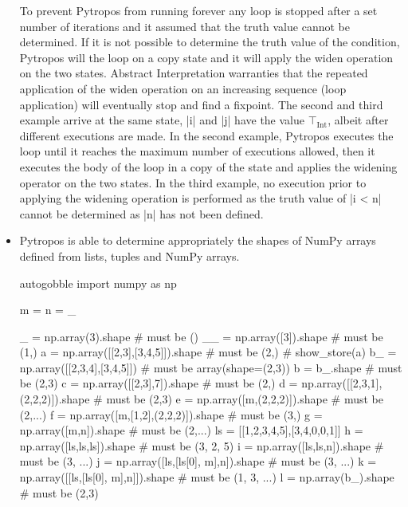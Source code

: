\begin{itemize}
  To prevent Pytropos from running forever any loop is stopped after a set number of
  iterations and it assumed that the truth value cannot be determined.  If it is not
  possible to determine the truth value of the condition, Pytropos will the loop on a copy
  state and it will apply the widen operation on the two states. Abstract Interpretation
  warranties that the repeated application of the widen operation on an increasing
  sequence (loop application) will eventually stop and find a fixpoint. The second and
  third example arrive at the same state, \pycode|i| and \pycode|j| have the value
  $\top_{\text{Int}}$, albeit after different executions are made. In the second example,
  Pytropos executes the loop until it reaches the maximum number of executions allowed,
  then it executes the body of the loop in a copy of the state and applies the widening
  operator on the two states. In the third example, no execution prior to applying the
  widening operation is performed as the truth value of \pycode|i < n| cannot be
  determined as \pycode|n| has not been defined.

\item Pytropos is able to determine appropriately the shapes of NumPy arrays defined from
  lists, tuples and NumPy arrays.

  \begin{pythoncode*}{autogobble}
    import numpy as np

    m = n = _

    _ = np.array(3).shape                   # must be ()
    __ = np.array([3]).shape                # must be (1,)
    a = np.array([[2,3],[3,4,5]]).shape     # must be (2,)
    # show_store(a)
    b_ = np.array([[2,3,4],[3,4,5]])        # must be array(shape=(2,3))
    b = b_.shape                            # must be (2,3)
    c = np.array([[2,3],7]).shape           # must be (2,)
    d = np.array([[2,3,1],(2,2,2)]).shape   # must be (2,3)
    e = np.array([m,(2,2,2)]).shape         # must be (2,...)
    f = np.array([m,[1,2],(2,2,2)]).shape   # must be (3,)
    g = np.array([m,n]).shape               # must be (2,...)
    ls = [[1,2,3,4,5],[3,4,0,0,1]]
    h = np.array([ls,ls,ls]).shape          # must be (3, 2, 5)
    i = np.array([ls,ls,n]).shape           # must be (3, ...)
    j = np.array([ls,[ls[0], m],n]).shape   # must be (3, ...)
    k = np.array([[ls,[ls[0], m],n]]).shape # must be (1, 3, ...)
    l = np.array(b_).shape                  # must be (2,3)
  \end{pythoncode*}


\end{itemize}
